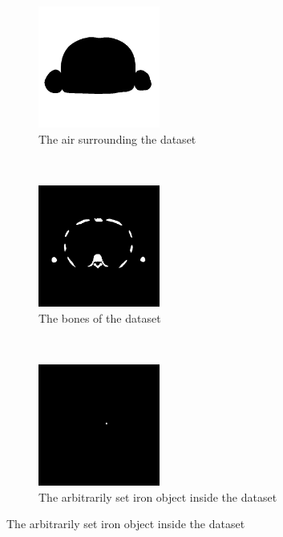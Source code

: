 \begin{figure}[h]
	\centering
	\begin{subfigure}[h]{0.3\textwidth}
		\centering
		\includegraphics[height=4cm]{images/KoreanAir.png}
		\caption{The air surrounding the dataset}
		\label{korean1}
	\end{subfigure}%
	~
	\begin{subfigure}[h]{0.3\textwidth}
		\centering
		\includegraphics[height=4cm]{images/KoreanBone.png}
		\caption{The bones of the dataset\linebreak}
		\label{korean2}
	\end{subfigure}%
	~
	\begin{subfigure}[h]{0.3\textwidth}
		\centering
		\includegraphics[height=4cm]{images/KoreanIron.png}
		\caption{The arbitrarily set iron object inside the dataset}
		\label{korean3}
	\end{subfigure}%
	

\end{figure}
